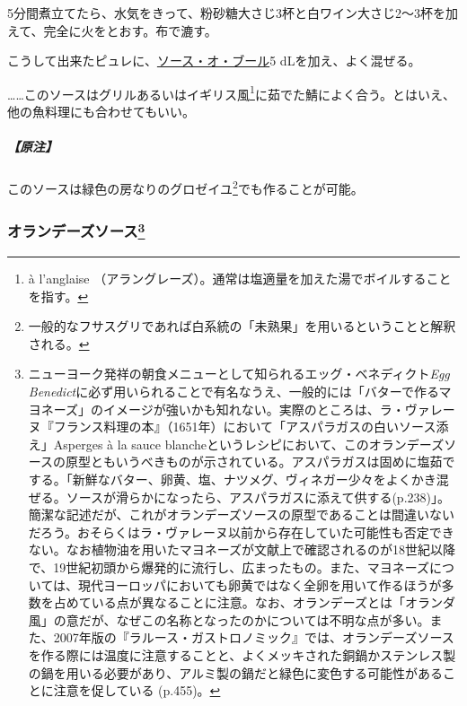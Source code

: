 \begin{recette}
5分間煮立てたら、水気をきって、粉砂糖大さじ3杯と白ワイン大さじ2〜3杯を加えて、完全に火をとおす。布で漉す。

こうして出来たピュレに、\protect\hyperlink{sauce-au-beurre}{ソース・オ・ブール}5
dLを加え、よく混ぜる。

\ldots{}\ldots{}このソースはグリルあるいはイギリス風\footnote{à
  l'anglaise
  （アラングレーズ）。通常は塩適量を加えた湯でボイルすることを指す。}に茹でた鯖によく合う。とはいえ、他の魚料理にも合わせてもいい。

\hypertarget{nota-sauce-groseiles}{%
\subparagraph{【原注】}\label{nota-sauce-groseiles}}

このソースは緑色の房なりのグロゼイユ\footnote{一般的なフサスグリであれば白系統の「未熟果」を用いるということと解釈される。}でも作ることが可能。

\hypertarget{sauce-hollandaise}{%
\subsubsection[オランデーズソース]{\texorpdfstring{オランデーズソース\footnote{ニューヨーク発祥の朝食メニューとして知られるエッグ・ベネディクト\emph{Egg
  Benedict}に必ず用いられることで有名なうえ、一般的には「バターで作るマヨネーズ」のイメージが強いかも知れない。実際のところは、ラ・ヴァレーヌ『フランス料理の本』（1651年）において「アスパラガスの白いソース添え」Asperges
  à la sauce
  blancheというレシピにおいて、このオランデーズソースの原型ともいうべきものが示されている。アスパラガスは固めに塩茹でする。「新鮮なバター、卵黄、塩、ナツメグ、ヴィネガー少々をよくかき混ぜる。ソースが滑らかになったら、アスパラガスに添えて供する(p.238)」。簡潔な記述だが、これがオランデーズソースの原型であることは間違いないだろう。おそらくはラ・ヴァレーヌ以前から存在していた可能性も否定できない。なお植物油を用いたマヨネーズが文献上で確認されるのが18世紀以降で、19世紀初頭から爆発的に流行し、広まったもの。また、マヨネーズについては、現代ヨーロッパにおいても卵黄ではなく全卵を用いて作るほうが多数を占めている点が異なることに注意。なお、オランデーズとは「オランダ風」の意だが、なぜこの名称となったのかについては不明な点が多い。また、2007年版の『ラルース・ガストロノミック』では、オランデーズソースを作る際には温度に注意することと、よくメッキされた銅鍋かステンレス製の鍋を用いる必要があり、アルミ製の鍋だと緑色に変色する可能性があることに注意を促している
  (p.455)。}}{オランデーズソース}}\label{sauce-hollandaise}}




\end{recette}
